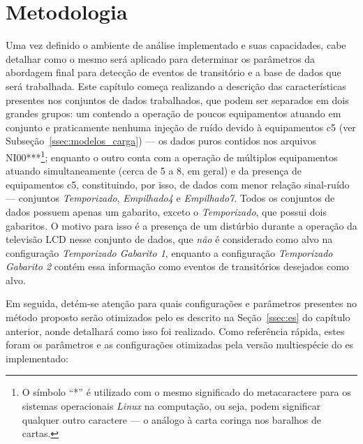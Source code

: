 \chapter{Metodologia}
\label{chap:metodologia}

Uma vez definido o ambiente de análise implementado e suas
capacidades, cabe detalhar como o mesmo será aplicado para
determinar os parâmetros da abordagem final para detecção de
eventos de transitório e a base de dados que será
trabalhada. Este capítulo começa realizando a descrição das
características presentes nos conjuntos de dados trabalhados, que
podem ser separados em dois grandes grupos: um contendo a operação de
poucos equipamentos atuando em conjunto e praticamente nenhuma
injeção de ruído devido à equipamentos \acs{c5} (ver
Subseção~\ref{ssec:modelos_carga}) --- os dados puros contidos nos
arquivos NI00***\footnote{O símbolo ``*'' é utilizado com o mesmo
significado do metacaractere para os sistemas operacionais
\emph{Linux} na computação, ou seja, podem significar qualquer outro
caractere --- o análogo à carta coringa nos baralhos de cartas.};
enquanto o outro conta com a operação de múltiplos equipamentos
atuando simultaneamente (cerca de 5 a 8, em geral) e da presença de
equipamentos \acs{c5}, constituindo, por isso, de dados com menor
relação sinal-ruído --- conjuntos \emph{Temporizado},
\emph{Empilhado4} e \emph{Empilhado7}. Todos os conjuntos de dados
possuem apenas um gabarito, exceto o \emph{Temporizado}, que possui
dois gabaritos. O motivo para isso é a presença de um distúrbio
durante a operação da televisão LCD nesse conjunto de dados, que
\emph{não} é considerado como alvo na configuração \emph{Temporizado
Gabarito 1}, enquanto a configuração \emph{Temporizado Gabarito 2}
contém essa informação como eventos de transitórios desejados como
alvo.


Em seguida, detém-se atenção para quais configurações e parâmetros
presentes no método proposto serão otimizados pelo \acs{es}
descrito na Seção~\ref{ssec:es} do capítulo anterior, aonde detalhará
como isso foi realizado. Como referência rápida, estes foram os
parâmetros e as configurações otimizadas pela versão multiespécie do
\acs{es} implementado:

